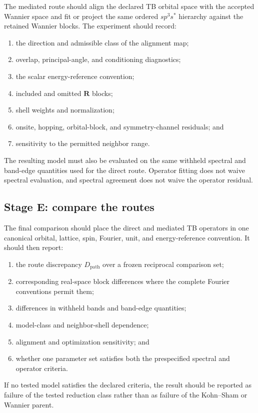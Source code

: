 The mediated route should align the declared TB orbital space with the accepted
Wannier space and fit or project the same ordered $sp^3s^{\ast}$ hierarchy
against the retained Wannier blocks. The experiment should record:
\begin{enumerate}
    \item the direction and admissible class of the alignment map;
    \item overlap, principal-angle, and conditioning diagnostics;
    \item the scalar energy-reference convention;
    \item included and omitted $\mathbf R$ blocks;
    \item shell weights and normalization;
    \item onsite, hopping, orbital-block, and symmetry-channel residuals; and
    \item sensitivity to the permitted neighbor range.
\end{enumerate}
The resulting model must also be evaluated on the same withheld spectral and
band-edge quantities used for the direct route. Operator fitting does not waive
spectral evaluation, and spectral agreement does not waive the operator
residual.

\subsection{Stage E: compare the routes}

The final comparison should place the direct and mediated TB operators in one
canonical orbital, lattice, spin, Fourier, unit, and energy-reference
convention. It should then report:
\begin{enumerate}
    \item the route discrepancy $D_{\mathrm{path}}$ over a frozen reciprocal
          comparison set;
    \item corresponding real-space block differences where the complete
          Fourier conventions permit them;
    \item differences in withheld bands and band-edge quantities;
    \item model-class and neighbor-shell dependence;
    \item alignment and optimization sensitivity; and
    \item whether one parameter set satisfies both the prespecified spectral
          and operator criteria.
\end{enumerate}
If no tested model satisfies the declared criteria, the result should be
reported as failure of the tested reduction class rather than as failure of the
Kohn--Sham or Wannier parent.

